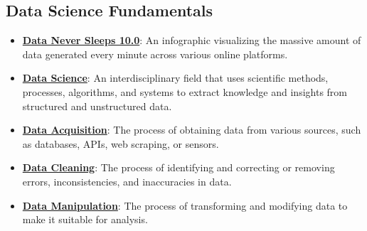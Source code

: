 \documentclass{article}%
\begin{document}
%
\subsection{Data Science Fundamentals}%
\label{subsec:DataScienceFundamentals}%
\begin{itemize}[leftmargin=*]%
\item \href{https://purdue.brightspace.com/d2l/common/assets/pdfjs-d2l-dist/1.0.14-legacy/web/viewer.html?file=\%2Fcontent\%2Fenforced\%2F1095465-WL.202510.CS24200.LE1\%2F01L1-introduction.pdf\%3Fou\%3D1095465\&lang=en-us\&container=d2l-fileviewer-rendered-pdf\&fullscreen=d2l-fileviewer-rendered-pdf-dialog\&height=667#page=2}{\textbf{Data Never Sleeps 10.0}}: An infographic visualizing the massive amount of data generated every minute across various online platforms.%
\item \href{https://purdue.brightspace.com/d2l/common/assets/pdfjs-d2l-dist/1.0.14-legacy/web/viewer.html?file=\%2Fcontent\%2Fenforced\%2F1095465-WL.202510.CS24200.LE1\%2F01L1-introduction.pdf\%3Fou\%3D1095465\&lang=en-us\&container=d2l-fileviewer-rendered-pdf\&fullscreen=d2l-fileviewer-rendered-pdf-dialog\&height=667#page=3}{\textbf{Data Science}}: An interdisciplinary field that uses scientific methods, processes, algorithms, and systems to extract knowledge and insights from structured and unstructured data.%
\item \href{https://purdue.brightspace.com/d2l/common/assets/pdfjs-d2l-dist/1.0.14-legacy/web/viewer.html?file=\%2Fcontent\%2Fenforced\%2F1095465-WL.202510.CS24200.LE1\%2F01L1-introduction.pdf\%3Fou\%3D1095465\&lang=en-us\&container=d2l-fileviewer-rendered-pdf\&fullscreen=d2l-fileviewer-rendered-pdf-dialog\&height=667#page=4}{\textbf{Data Acquisition}}: The process of obtaining data from various sources, such as databases, APIs, web scraping, or sensors.%
\item \href{https://purdue.brightspace.com/d2l/common/assets/pdfjs-d2l-dist/1.0.14-legacy/web/viewer.html?file=\%2Fcontent\%2Fenforced\%2F1095465-WL.202510.CS24200.LE1\%2F01L1-introduction.pdf\%3Fou\%3D1095465\&lang=en-us\&container=d2l-fileviewer-rendered-pdf\&fullscreen=d2l-fileviewer-rendered-pdf-dialog\&height=667#page=4}{\textbf{Data Cleaning}}: The process of identifying and correcting or removing errors, inconsistencies, and inaccuracies in data.%
\item \href{https://purdue.brightspace.com/d2l/common/assets/pdfjs-d2l-dist/1.0.14-legacy/web/viewer.html?file=\%2Fcontent\%2Fenforced\%2F1095465-WL.202510.CS24200.LE1\%2F01L1-introduction.pdf\%3Fou\%3D1095465\&lang=en-us\&container=d2l-fileviewer-rendered-pdf\&fullscreen=d2l-fileviewer-rendered-pdf-dialog\&height=667#page=4}{\textbf{Data Manipulation}}: The process of transforming and modifying data to make it suitable for analysis.%

\end{itemize}
\end{document}
